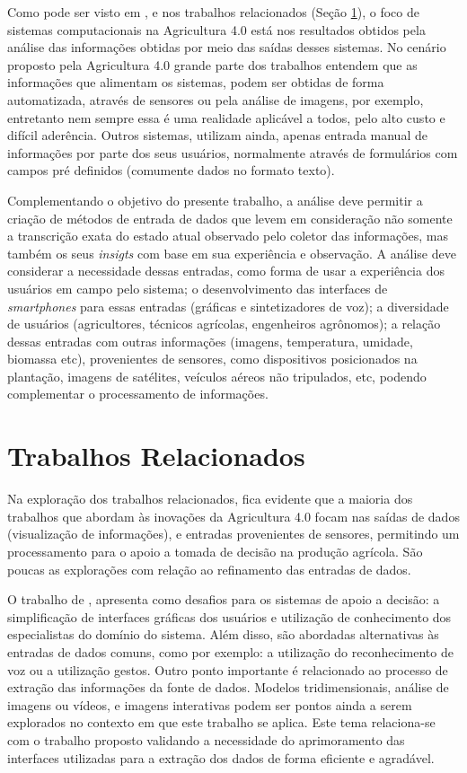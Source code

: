 \documentclass[12pt]{article}
\begin{document}
Como pode ser visto em \cite{Massruha:2017}, e nos trabalhos relacionados (Seção \ref{sec:trabalhos_relacionados}), o foco de sistemas computacionais na Agricultura 4.0 está nos resultados obtidos pela análise das informações obtidas por meio das saídas desses sistemas. No cenário proposto pela Agricultura 4.0 grande parte dos trabalhos entendem que as informações que alimentam os sistemas, podem ser obtidas de forma automatizada, através de sensores ou pela análise de imagens, por exemplo, entretanto nem sempre essa é uma realidade aplicável a todos, pelo alto custo e difícil aderência. Outros sistemas, utilizam ainda, apenas entrada manual de informações por parte dos seus usuários, normalmente através de formulários com campos pré definidos (comumente dados no formato texto).

Complementando o objetivo do presente trabalho, a análise deve permitir a criação de métodos de entrada de dados que levem em consideração não somente a transcrição exata do estado atual observado pelo coletor das informações, mas também os seus \textit{insigts} com base em sua experiência e observação. A análise deve considerar a necessidade dessas entradas, como forma de usar a experiência dos usuários em campo pelo sistema; o desenvolvimento das interfaces de \textit{smartphones} para essas entradas (gráficas e sintetizadores de voz); a diversidade de usuários (agricultores, técnicos agrícolas, engenheiros agrônomos); a relação dessas entradas com outras informações (imagens, temperatura, umidade, biomassa etc), provenientes de sensores, como dispositivos posicionados na plantação, imagens de satélites, veículos aéreos não tripulados, etc, podendo complementar o processamento de informações.

\section{Trabalhos Relacionados}
\label{sec:trabalhos_relacionados}

Na exploração dos trabalhos relacionados, fica evidente que a maioria dos trabalhos que abordam às inovações da Agricultura 4.0 focam nas saídas de dados (visualização de informações), e entradas provenientes de sensores, permitindo um processamento para o apoio a tomada de decisão na produção agrícola. São poucas as explorações com relação ao refinamento das entradas de dados. 

O trabalho de \cite{Zhai:2020}, apresenta como desafios para os sistemas de apoio a decisão: a simplificação de interfaces gráficas dos usuários e utilização de conhecimento dos especialistas do domínio do sistema. Além disso, são abordadas alternativas às entradas de dados comuns, como por exemplo: a utilização do reconhecimento de voz ou a utilização gestos. Outro ponto importante é relacionado ao processo de extração das informações da fonte de dados. Modelos tridimensionais, análise de imagens ou vídeos, e imagens interativas podem ser pontos ainda a serem explorados no contexto em que este trabalho se aplica. Este tema relaciona-se com o trabalho proposto validando a necessidade do aprimoramento das interfaces utilizadas para a extração dos dados de forma eficiente e agradável.
\end{document}
